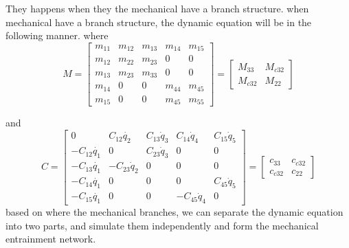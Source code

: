 {They happens when they the mechanical have a branch structure.
when mechanical have a branch structure,
the dynamic equation will be in the following manner.
where
\[
M=\left[\begin{array}{ccc|cc}
m_{11} & m_{12} & m_{13} & m_{14} & m_{15}\\
m_{12} & m_{22} & m_{23} & 0 & 0\\
m_{13} & m_{23} & m_{33} & 0 & 0\\ \hline
m_{14} & 0 & 0 & m_{44} & m_{45}\\
m_{15} & 0 & 0 & m_{45} & m_{55}\end{array}\right]
=\left[\begin{array}{cc}
M_{33} & M_{c32}\\
M_{c32} & M_{22}\end{array}\right]
\]

and
\[
C=
\left[\begin{array}{ccc|cc}
0 & C_{12}\dot{q_{2}} & C_{13}\dot{q}_{3} & C_{14}\dot{q}_{4} & C_{15}\dot{q}_{5}\\
-C_{12}\dot{q_{1}} & 0 & C_{23}\dot{q}_{3} & 0 & 0\\
-C_{13}\dot{q_{1}} & -C_{23}\dot{q}_{2} & 0 & 0 & 0\\ \hline
-C_{14}\dot{q_{1}} & 0 & 0 & 0 & C_{45}\dot{q}_{5}\\
-C_{15}\dot{q_{1}} & 0 & 0 & -C_{45}\dot{q}_{4} & 0\end{array}\right]
=\left[\begin{array}{cc}
c_{33} & c_{c32}\\
c_{c32} & c_{22}\end{array}\right]
\]
based on where the mechanical branches, we can separate the dynamic equation into two parts,
and simulate them independently and form the mechanical entrainment network.


}
